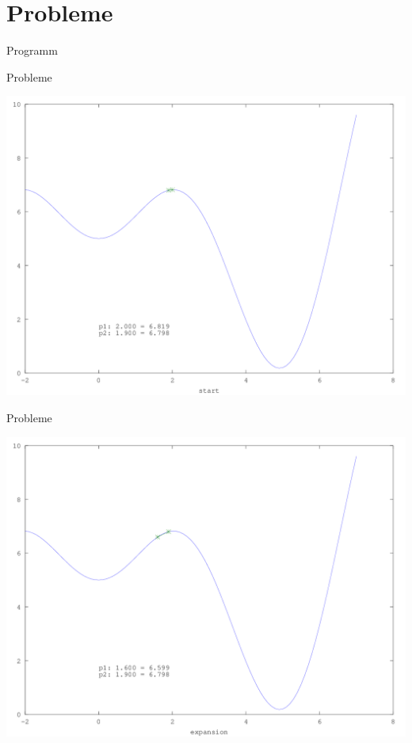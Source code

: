 \documentclass[\outputformat]{beamer}
\begin{document}
\section{Probleme}
\begin{frame}{Programm}\tableofcontents[currentsection]\end{frame}
\begin{frame}{Probleme}
	\begin{center}
		\includegraphics[height=0.75\paperheight]{../bilder/LokMinima/sinx_x001.png}
	\end{center}
\end{frame}
\begin{frame}{Probleme}
	\begin{center}
		\includegraphics[height=0.75\paperheight]{../bilder/LokMinima/sinx_x002.png}
	\end{center}
\end{frame}
\end{document}
